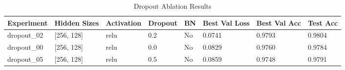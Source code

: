 \begin{table}[t]
    \centering
    \caption{Dropout Ablation Results}
    \label{tab:dropout_ablation}
    \begin{tabular}{llllllll}
        \toprule
        Experiment & Hidden Sizes & Activation & Dropout & BN & Best Val Loss & Best Val Acc & Test Acc \\
        \midrule
        dropout_02 & [256, 128] & relu & 0.2 & No & 0.0741 & 0.9793 & 0.9804 \\
        dropout_00 & [256, 128] & relu & 0.0 & No & 0.0829 & 0.9760 & 0.9784 \\
        dropout_05 & [256, 128] & relu & 0.5 & No & 0.0859 & 0.9748 & 0.9791 \\
        \bottomrule
    \end{tabular}
\end{table}